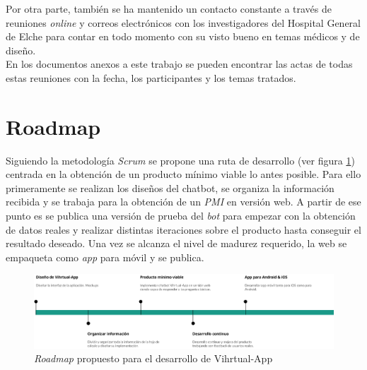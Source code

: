 Por otra parte, también se ha mantenido un contacto constante a través de reuniones \textit{online} y correos electrónicos con los investigadores del Hospital General de Elche para contar en todo momento con su visto bueno en temas médicos y de diseño.\\

En los documentos anexos a este trabajo se pueden encontrar las actas de todas estas reuniones con la fecha, los participantes y los temas tratados.\\


\section{Roadmap}
Siguiendo la metodología \textit{Scrum} se propone una ruta de desarrollo (ver figura \ref{fig:roadmap desarrollo}) centrada en la obtención de un producto mínimo viable lo antes posible. Para ello primeramente se realizan los diseños del chatbot, se organiza la información recibida y se trabaja para la obtención de un \textit{PMI} en versión web. A partir de ese punto es se publica una versión de prueba del \textit{bot} para empezar con la obtención de datos reales  y realizar distintas iteraciones sobre el producto hasta conseguir el resultado deseado. Una vez se alcanza el nivel de madurez requerido, la web se empaqueta como \textit{app} para móvil y se publica.\\

\begin{figure}[htbp]
\centering
\includegraphics[scale=0.4]{../images/roadmap.png} 
\caption{\textit{Roadmap} propuesto para el desarrollo de Vihrtual-App}
\label{fig:roadmap desarrollo}
\end{figure}


